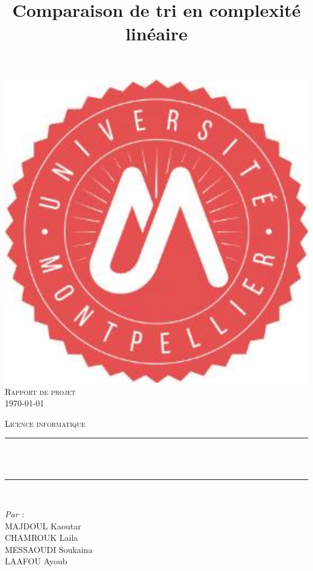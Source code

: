 \documentclass[11pt]{article}
\title{Comparaison de tri en complexité linéaire}								%
\makeatletter
\let\thetitle\@title
\makeatother
\begin{document}

\begin{titlepage}
	\centering
    \vspace*{0.1 cm}
    \includegraphics[scale = 1.2]{logo.png}\\[3.0 cm]	%
    \textsc{\LARGE  Rapport de projet }\\[1.0 cm]	%
 


\ddmmyyyydate \today

    
    
	\textsc{\Large Licence informatique }\\[0.5 cm]				%
	\rule{\linewidth}{0.2 mm} \\[0.4 cm]
	{ \huge \bfseries \thetitle}\\
	\rule{\linewidth}{0.2 mm} \\[1.5 cm]
	
	\begin{minipage}{0.4\textwidth}
		\begin{flushleft} \large
			\emph{Par :}\\
			MAJDOUL  Kaoutar\\
            CHAMROUK Laila\\
            MESSAOUDI Soukaina\\
            LAAFOU Ayoub\\
			\end{flushleft}
			\end{minipage}~
			\begin{minipage}{0.4\textwidth}
            

\end{minipage}
\end{titlepage}
\end{document}
